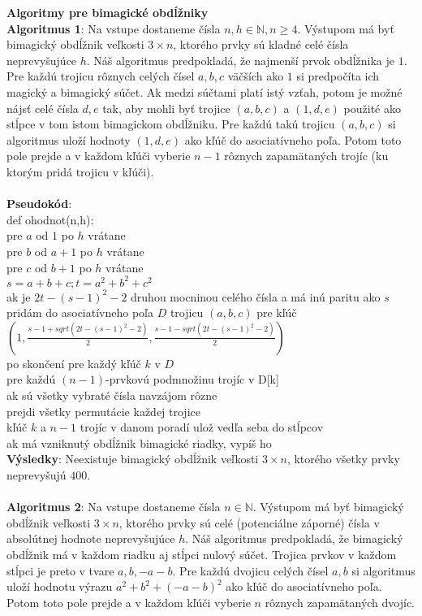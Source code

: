 \documentclass[12pt]{article}
\begin{document}
\textbf{Algoritmy pre bimagické obdĺžniky} \\

\textbf{Algoritmus 1}: Na vstupe dostaneme čísla $n,h \in \mathbb{N}, n \geq 4$. Výstupom má byť bimagický obdĺžnik veľkosti $3 \times n$, ktorého prvky sú kladné celé čísla neprevyšujúce $h$. Náš algoritmus predpokladá, že najmenší prvok obdĺžnika je $1$. Pre každú trojicu rôznych celých čísel $a,b,c$ väčších ako $1$ si predpočíta ich magický a bimagický súčet. Ak medzi súčtami platí istý vzťah, potom je možné nájsť celé čísla $d,e$ tak, aby mohli byť trojice $(a,b,c)$ a $(1,d,e)$ použité ako stĺpce v tom istom bimagickom obdĺžniku. Pre každú takú trojicu $(a,b,c)$ si algoritmus uloží hodnoty $(1,d,e)$ ako kľúč do asociatívneho poľa. Potom toto pole prejde a v každom kľúči vyberie $n-1$ rôznych zapamätaných trojíc (ku ktorým pridá trojicu v kľúči). \\ \\

\textbf{Pseudokód}: \\
def ohodnot(n,h): \\
pre $a$ od $1$ po $h$ vrátane \\
pre $b$ od $a+1$ po $h$ vrátane \\
pre $c$ od $b+1$ po $h$ vrátane \\
$s = a+b+c; t = a^2+b^2+c^2$ \\
ak je $2t - (s-1)^2 - 2$ druhou mocninou celého čísla a má inú paritu ako $s$ \\
pridám do asociatívneho poľa $D$ trojicu $(a,b,c)$ pre kľúč $(1, \frac{s-1 + sqrt(2t - (s-1)^2 - 2)}{2}, \frac{s-1 - sqrt(2t - (s-1)^2 - 2)}{2})$ \\
po skončení pre každý kľúč $k$ v $D$ \\
pre každú $(n-1)$-prvkovú podmnožinu trojíc v D[k] \\
ak sú všetky vybraté čísla navzájom rôzne \\
prejdi všetky permutácie každej trojice \\
kľúč $k$ a $n-1$ trojíc v danom poradí ulož vedľa seba do stĺpcov \\
ak má vzniknutý obdĺžnik bimagické riadky, vypíš ho \\

\textbf{Výsledky}: Neexistuje bimagický obdĺžnik veľkosti $3 \times n$, ktorého všetky prvky neprevyšujú $400$. \\\\

\textbf{Algoritmus 2}: Na vstupe dostaneme čísla $n \in \mathbb{N}$. Výstupom má byť bimagický obdĺžnik veľkosti $3 \times n$, ktorého prvky sú celé (potenciálne záporné) čísla v absolútnej hodnote neprevyšujúce $h$. Náš algoritmus predpokladá, že bimagický obdĺžnik má v každom riadku aj stĺpci nulový súčet. Trojica prvkov v každom stĺpci je preto v tvare $a, b, -a-b$. Pre každú dvojicu celých čísel $a,b$ si algoritmus uloží hodnotu výrazu $a^2 + b^2 + (-a-b)^2$ ako kľúč do asociatívneho poľa. Potom toto pole prejde a v každom kľúči vyberie $n$ rôznych zapamätaných dvojíc. \\
\end{document}
